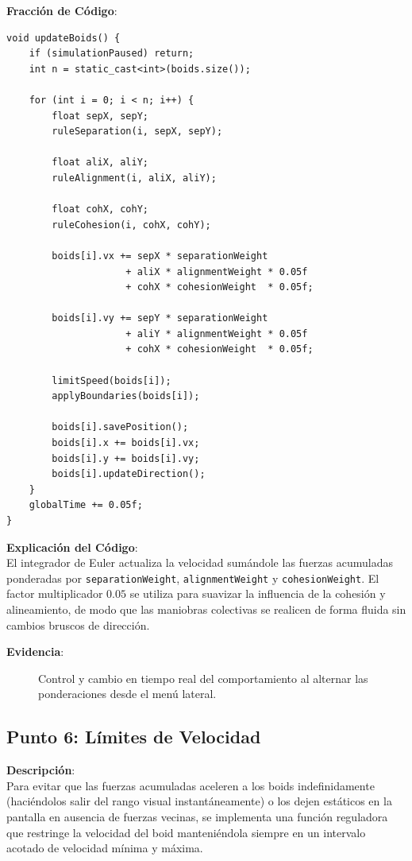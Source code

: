 \documentclass[11pt,a4paper]{article}
\begin{document}
\textbf{Fracción de Código}:
\begin{lstlisting}[caption={Combinación lineal de fuerzas ponderadas en simulacion.cpp}, label={lst:combine_rules}]
void updateBoids() {
    if (simulationPaused) return;
    int n = static_cast<int>(boids.size());

    for (int i = 0; i < n; i++) {
        float sepX, sepY;
        ruleSeparation(i, sepX, sepY);

        float aliX, aliY;
        ruleAlignment(i, aliX, aliY);

        float cohX, cohY;
        ruleCohesion(i, cohX, cohY);

        boids[i].vx += sepX * separationWeight
                     + aliX * alignmentWeight * 0.05f
                     + cohX * cohesionWeight  * 0.05f;

        boids[i].vy += sepY * separationWeight
                     + aliY * alignmentWeight * 0.05f
                     + cohX * cohesionWeight  * 0.05f;

        limitSpeed(boids[i]);
        applyBoundaries(boids[i]);

        boids[i].savePosition();
        boids[i].x += boids[i].vx;
        boids[i].y += boids[i].vy;
        boids[i].updateDirection();
    }
    globalTime += 0.05f;
}
\end{lstlisting}

\textbf{Explicación del Código}: \\
El integrador de Euler actualiza la velocidad sumándole las fuerzas acumuladas ponderadas por \lstinline{separationWeight}, \lstinline{alignmentWeight} y \lstinline{cohesionWeight}. El factor multiplicador $0.05$ se utiliza para suavizar la influencia de la cohesión y alineamiento, de modo que las maniobras colectivas se realicen de forma fluida sin cambios bruscos de dirección.

\textbf{Evidencia}:
\begin{figure}[htbp]
    \centering
    \caption{Control y cambio en tiempo real del comportamiento al alternar las ponderaciones desde el menú lateral.}
    \label{fig:evidencia_punto5}
\end{figure}

\newpage

\subsection{Punto 6: Límites de Velocidad}
\textbf{Descripción}: \\
Para evitar que las fuerzas acumuladas aceleren a los boids indefinidamente (haciéndolos salir del rango visual instantáneamente) o los dejen estáticos en la pantalla en ausencia de fuerzas vecinas, se implementa una función reguladora que restringe la velocidad del boid manteniéndola siempre en un intervalo acotado de velocidad mínima y máxima.
\end{document}
